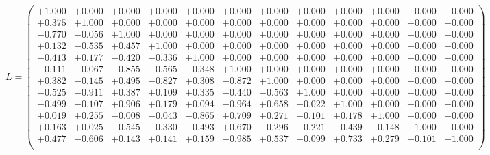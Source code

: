 \documentclass[9pt]{article}
\theoremstyle{plain}
\theoremstyle{definition}
\theoremstyle{remark}
\numberwithin{equation}{section}
\begin{document}
$L = \left(
\begin{array}{
cccccccccccc}
+1.000 & +0.000 & +0.000 & +0.000 & +0.000 & +0.000 & +0.000 & +0.000 & +0.000 & +0.000 & +0.000 & +0.000 \\
+0.375 & +1.000 & +0.000 & +0.000 & +0.000 & +0.000 & +0.000 & +0.000 & +0.000 & +0.000 & +0.000 & +0.000 \\
-0.770 & -0.056 & +1.000 & +0.000 & +0.000 & +0.000 & +0.000 & +0.000 & +0.000 & +0.000 & +0.000 & +0.000 \\
+0.132 & -0.535 & +0.457 & +1.000 & +0.000 & +0.000 & +0.000 & +0.000 & +0.000 & +0.000 & +0.000 & +0.000 \\
-0.413 & +0.177 & -0.420 & -0.336 & +1.000 & +0.000 & +0.000 & +0.000 & +0.000 & +0.000 & +0.000 & +0.000 \\
-0.111 & -0.067 & -0.855 & -0.565 & -0.348 & +1.000 & +0.000 & +0.000 & +0.000 & +0.000 & +0.000 & +0.000 \\
+0.382 & -0.145 & +0.495 & -0.827 & +0.308 & -0.872 & +1.000 & +0.000 & +0.000 & +0.000 & +0.000 & +0.000 \\
-0.525 & -0.911 & +0.387 & +0.109 & +0.335 & -0.440 & -0.563 & +1.000 & +0.000 & +0.000 & +0.000 & +0.000 \\
-0.499 & -0.107 & +0.906 & +0.179 & +0.094 & -0.964 & +0.658 & -0.022 & +1.000 & +0.000 & +0.000 & +0.000 \\
+0.019 & +0.255 & -0.008 & -0.043 & -0.865 & +0.709 & +0.271 & -0.101 & +0.178 & +1.000 & +0.000 & +0.000 \\
+0.163 & +0.025 & -0.545 & -0.330 & -0.493 & +0.670 & -0.296 & -0.221 & -0.439 & -0.148 & +1.000 & +0.000 \\
+0.477 & -0.606 & +0.143 & +0.141 & +0.159 & -0.985 & +0.537 & -0.099 & +0.733 & +0.279 & +0.101 & +1.000 \\
\end{array}
\right)$ \newline 
\end{document}

